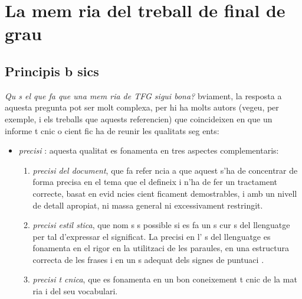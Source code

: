 \chapter{La mem ria del treball de final de grau}\label{mem ria}
\section{Principis b sics}

\emph{Qu   s el que fa que una mem ria de TFG sigui bona?}  bviament, la resposta a aquesta pregunta pot ser molt complexa, per  hi ha molts autors (vegeu, per exemple, \cite{Perelman01,Malvar08} i els treballs que aquests referencien) que coincideixen en que un informe t cnic o cient fic ha de reunir les qualitats seg ents:
\begin{itemize}
   \item \emph{precisi }: aquesta qualitat es fonamenta en tres aspectes complementaris:
   \begin{enumerate}

   \item \emph{precisi  del document}, que fa refer ncia a que aquest s'ha de concentrar de forma precisa en el tema que el defineix i n'ha de fer un tractament correcte, basat en evid ncies cient ficament demostrables, i amb un nivell de detall apropiat, ni massa general ni excessivament restringit.

   \item \emph{precisi  estil stica}, que nom s  s possible si es fa un  s cur s del llenguatge per tal d'expressar el significat. La precisi  en l' s del llenguatge es fonamenta en el rigor en la utilitzaci  de les paraules, en una estructura correcta de les frases i en un  s adequat dels signes de puntuaci .

   \item \emph{precisi  t cnica}, que es fonamenta en un bon coneixement t cnic de la mat ria i del seu vocabulari.
   \end{enumerate}


\end{itemize}
